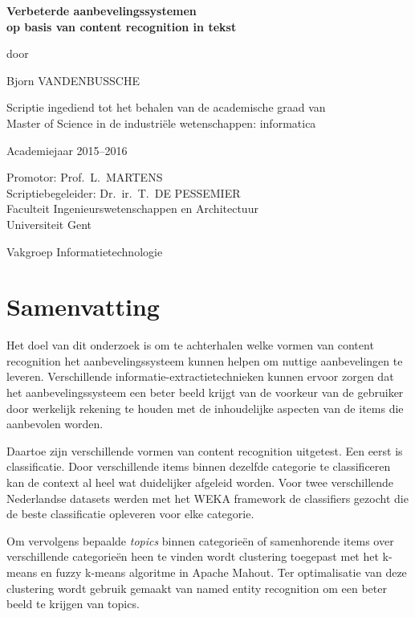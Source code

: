 
\newpage

{
\setlength{\baselineskip}{14pt}
\setlength{\parindent}{0pt}
\setlength{\parskip}{8pt}

\begin{center}

\noindent \textbf{\huge
Verbeterde aanbevelingssystemen\\[8pt]op basis van content recognition in tekst
}

door 

Bjorn VANDENBUSSCHE

Scriptie ingediend tot het behalen van de academische graad van\\ 
Master of Science in de industri\"ele wetenschappen: informatica

Academiejaar 2015--2016

Promotor: Prof.~L.~MARTENS\\
Scriptiebegeleider: Dr.~ir.~T.~DE PESSEMIER\\

Faculteit Ingenieurswetenschappen en Architectuur\\
Universiteit Gent

Vakgroep Informatietechnologie

\end{center}

\section*{Samenvatting}

Het doel van dit onderzoek is om te achterhalen welke vormen van content recognition het aanbevelingssysteem kunnen helpen om nuttige aanbevelingen te leveren. Verschillende informatie-extractietechnieken kunnen ervoor zorgen dat het aanbevelingssysteem een beter beeld krijgt van de voorkeur van de gebruiker door werkelijk rekening te houden met de inhoudelijke aspecten van de items die aanbevolen worden.

Daartoe zijn verschillende vormen van content recognition uitgetest. Een eerst is classificatie. Door verschillende items binnen dezelfde categorie te classificeren kan de context al heel wat duidelijker afgeleid worden. Voor twee verschillende Nederlandse datasets werden met het WEKA framework de classifiers gezocht die de beste classificatie opleveren voor elke categorie.

Om vervolgens bepaalde \textit{topics} binnen categorie\"en of samenhorende items over verschillende categorie\"en heen te vinden wordt clustering toegepast met het k-means en fuzzy k-means algoritme in Apache Mahout. Ter optimalisatie van deze clustering wordt gebruik gemaakt van named entity recognition om een beter beeld te krijgen van topics.

}
